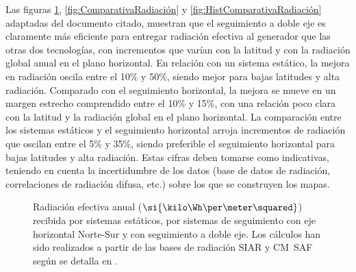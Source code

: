 Las figuras \ref{fig:MapasRadiacion}, \ref{fig:ComparativaRadiación} y
\ref{fig:HistComparativaRadiación} adaptadas del documento citado,
muestran que el seguimiento a doble eje es claramente más eficiente
para entregar radiación efectiva al generador que las otras dos
tecnologías, con incrementos que varían con la latitud y con la
radiación global anual en el plano horizontal. En relación con un
sistema estático, la mejora en radiación oscila entre el 10\% y 50\%,
siendo mejor para bajas latitudes y alta radiación. Comparado con el
seguimiento horizontal, la mejora se mueve en un margen estrecho
comprendido entre el 10\% y 15\%, con una relación poco clara con la
latitud y la radiación global en el plano horizontal.  La comparación
entre los sistemas estáticos y el seguimiento horizontal arroja
incrementos de radiación que oscilan entre el 5\% y 35\%, siendo
preferible el seguimiento horizontal para bajas latitudes y alta
radiación. Estas cifras deben tomarse como indicativas, teniendo en
cuenta la incertidumbre de los datos (base de datos de radiación,
correlaciones de radiación difusa, etc.) sobre los que se construyen
los mapas.

%
\begin{figure}
  \begin{centering}
  \end{centering}

\begin{centering}
  \par\end{centering}

\begin{centering}
  \par\end{centering}
\caption[Mapas de Radiación Efectiva]{Radiación efectiva
  anual ($\si{\kilo\Wh\per\meter\squared}$) recibida por sistemas
  estáticos, por sistemas de seguimiento con eje horizontal Norte-Sur
  y con seguimiento a doble eje. Los cálculos han sido realizados a
  partir de las bases de radiación SIAR \cite{SIAR2011} y CM~SAF
  \cite{Posselt.Muller.ea2011} según se detalla en
  \cite{Antonanzas-Torres.Canizares.ea2013}.}
\label{fig:MapasRadiacion}
\end{figure}


